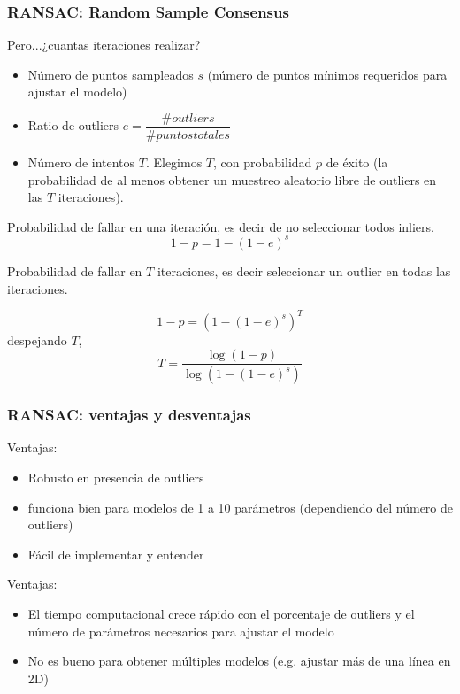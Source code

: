 \begin{frame}
	\frametitle{RANSAC: Random Sample Consensus}
	\footnotesize
	
	Pero...¿cuantas iteraciones realizar?
	
	\begin{itemize}
		\item Número de puntos sampleados $s$ (número de puntos mínimos requeridos para ajustar el modelo)
		\item Ratio de outliers $e = \dfrac{\# outliers}{\# puntos totales}$
		\item Número de intentos $T$.
		Elegimos $T$, con probabilidad $p$ de éxito (la probabilidad de al menos obtener un muestreo aleatorio libre de outliers en las $T$ iteraciones).
	\end{itemize}
	
	Probabilidad de fallar en una iteración, es decir de no seleccionar todos inliers.
	\begin{equation*}
		1-p = 1 - (1 - e)^{s}
	\end{equation*} 
	
	
	Probabilidad de fallar en $T$ iteraciones, es decir seleccionar un outlier en todas las iteraciones.
	
	\begin{equation*}
		1-p = (1 - (1 - e)^{s})^{T}
	\end{equation*} 
	despejando $T$,
	\begin{equation*}
		T = \dfrac{\log(1-p)}{\log(1-(1-e)^{s})}
	\end{equation*} 
	
\end{frame}

\begin{frame}
	\frametitle{RANSAC: ventajas y desventajas}
	\footnotesize
	Ventajas:
	\begin{itemize}
		\item Robusto en presencia de outliers
		\item funciona bien para modelos de 1 a 10 parámetros (dependiendo del número de outliers)
		\item Fácil de implementar y entender
	\end{itemize}
	Ventajas:
	\begin{itemize}
		\item El tiempo computacional crece rápido con el porcentaje de outliers y el número de parámetros necesarios para ajustar el modelo
		\item No es bueno para obtener múltiples modelos (e.g. ajustar más de una línea en 2D)
	\end{itemize}
\end{frame}

